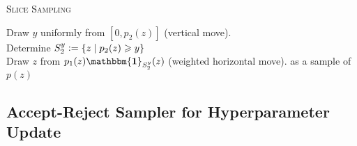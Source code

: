 {\fontsize{4}{4}\selectfont
\begin{algorithm}[t]
\caption{\textsc{Slice Sampling}}
    {
    Draw $y$ uniformly from $\left[0,p_2(z)\right]$ (vertical move).\\
    Determine $S_2^y \mathrel{\mathop:}= \left\lbrace z \;|\; p_2(z) \geqslant y \right\rbrace$\\
	Draw $z$ from $p_1(z) \mathbf{\mathbbm{1}}_{S^y_2}(z)$ (weighted horizontal move).
    }
{ as a sample of $p(z)$}
\label{alg:Slice}
\end{algorithm}
}


\subsection{Accept-Reject Sampler for Hyperparameter Update} \label{sec:DetailsGammaSampler}


